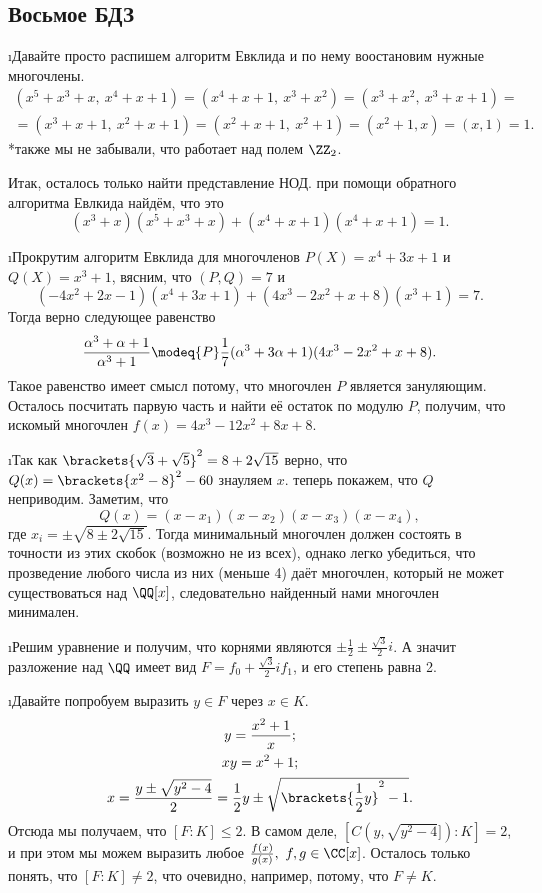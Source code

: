 \subsection{Восьмое БДЗ}

\i Давайте просто распишем алгоритм Евклида и по нему воостановим нужные многочлены.
\begin{gather*}
    (x^5 + x^3 + x,\ x^4 + x + 1) = (x^4 + x + 1,\ x^3 + x^2) = (x^3 + x^2,\ x^3 + x + 1) = \\ =
    (x^3 + x + 1,\ x^2 + x + 1) = (x^2 + x + 1,\ x^2 + 1) = (x^2 + 1, x) = (x, 1) = 1.
\end{gather*}
*также мы не забывали, что работает над полем $\ZZ_2$.
\par Итак, осталось только найти представление НОД. при помощи обратного алгоритма Евлкида найдём, что это 
$$
    (x^3 + x)(x^5 + x^3 + x) + (x^4 + x + 1)(x^4 + x + 1) = 1.
$$


\i Прокрутим алгоритм Евклида для многочленов $P(X) = x^4 + 3x + 1$ и $Q(X) = x^3 + 1$, вясним, что $(P, Q) = 7$ и 
$$
    (-4x^2 + 2x - 1)(x^4 + 3x + 1) + (4x^3 - 2x^2 + x + 8)(x^3 + 1) = 7.
$$
Тогда верно следующее равенство
$$
    \frac{\alpha^3 + \alpha + 1}{\alpha^3 + 1} \modeq{P} \frac{1}{7}(\alpha^3 + 3\alpha + 1)(4x^3 - 2x^2 + x + 8).
$$
Такое равенство имеет смысл потому, что многочлен $P$ является зануляющим. Осталось посчитать парвую часть и найти её остаток по модулю $P$, получим, что искомый многочлен $f(x) = 4x^3 - 12x^2 + 8x + 8$.


\i Так как $\brackets{\sqrt{3}+\sqrt{5}}^2 = 8 + 2\sqrt{15}$ верно, что $Q(x) = \brackets{x^2 - 8}^2 - 60$ знауляем $x$. теперь покажем, что $Q$ неприводим. Заметим, что 
$$
    Q(x) = (x - x_1)(x-x_2)(x-x_3)(x-x_4),
$$
где $x_i = \pm\sqrt{8 \pm 2\sqrt{15}}$. Тогда минимальный многочлен должен состоять в точности из этих скобок (возможно не из всех), однако легко убедиться, что прозведение любого числа из них (меньше 4) даёт многочлен, который не может существоваться над $\QQ[x]$, следовательно найденный нами многочлен минимален.


\i Решим уравнение и получим, что корнями являются $\pm\frac{1}{2} \pm \frac{\sqrt{3}}{2}i$. А значит разложение над $\QQ$ имеет вид $F = f_0 + \frac{\sqrt{3}}{2}if_1$, и его степень равна 2.


\i Давайте попробуем выразить $y \in F$ через $x \in K$.
\begin{gather*}
    y = \frac{x^2 + 1}{x};\\
    xy = x^2 + 1;\\
    x = \frac{y \pm \sqrt{y^2 - 4}}{2} = \frac{1}{2}y \pm \sqrt{\brackets{\frac{1}{2}y}^2 - 1}.
\end{gather*}
Отсюда мы получаем, что $[F : K] \leq 2$. В самом деле, $[C(y, \sqrt{y^2 - 4}]) : K] = 2$, и при этом мы можем выразить любое $\frac{f(x)}{g(x)},\ f, g \in \CC[x]$. Осталось только понять, что $[F : K] \ne 2$, что очевидно, например, потому, что $F \ne K$.